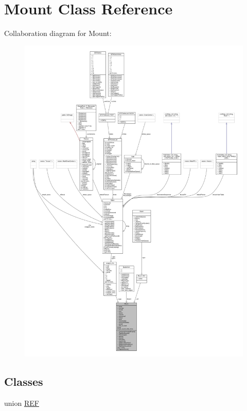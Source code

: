 \hypertarget{classMount}{}\section{Mount Class Reference}
\label{classMount}


Collaboration diagram for Mount\+:
\nopagebreak
\begin{figure}[H]
\begin{center}
\leavevmode
\includegraphics[width=350pt]{d4/d80/classMount__coll__graph}
\end{center}
\end{figure}
\subsection*{Classes}
\begin{DoxyCompactItemize}
\item 
union \hyperlink{unionMount_1_1REF}{R\+EF}
\end{DoxyCompactItemize}
